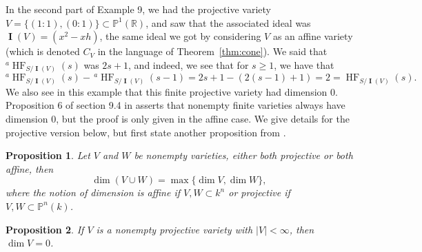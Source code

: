 \documentclass[11pt]{article}
\newcommand{\R}{\mathbb{R}}
\newcommand{\Proj}{\mathbb{P}}
\DeclareMathOperator{\HF}{HF}
\DeclareMathOperator{\I}{\mathbf{I}}
\newtheorem{proposition}{Proposition}
\theoremstyle{definition}
\begin{document}
In the second part of Example 9, we had the projective variety $V = \{(1:1), (0:1)\} \subset \Proj^1(\R)$, and saw that the associated ideal was $\I(V) = (x^2 - xh)$, the same ideal we got by considering $V$ as an affine variety (which is denoted $C_V$ in the language of Theorem~\ref{thm:cone}). We said that $^a\HF_{S/\I(V)}(s)$ was $2s + 1$, and indeed, we see that for $s \geq 1$, we have that \[ ^a\HF_{S/\I(V)}(s) - \, ^a\HF_{S/\I(V)}(s - 1) = 2s + 1 - (2(s - 1) + 1) = 2 = \HF_{S/\I(V)}(s). \] We also see in this example that this finite projective variety had dimension 0. Proposition 6 of section 9.4 in \cite{cox2013ideals} asserts that nonempty finite varieties always have dimension 0, but the proof is only given in the affine case. We give details for the projective version below, but first state another proposition from \cite{cox2013ideals}.


\begin{proposition}\label{dimmax}
	Let $V$ and $W$ be nonempty varieties, either both projective or both affine, then \[ \dim (V \cup W) = \max\{\dim V, \dim W\}, \] where the notion of dimension is affine if $V,W \subset k^n$ or projective if $V,W \subset \Proj^n(k)$. 
\end{proposition}


\begin{proposition}
	If $V$ is a nonempty projective variety with $|V| < \infty$, then $\dim V = 0$. 
\end{proposition}
\end{document}
